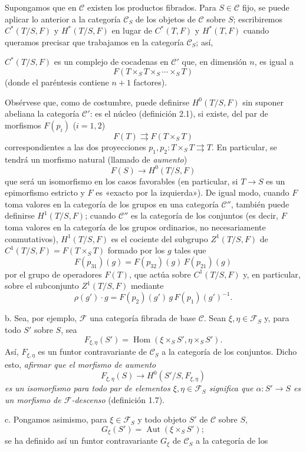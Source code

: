 Supongamos que en $\mathcal C$ existen los productos fibrados. Para
$S\in\mathcal C$ fijo, se puede aplicar lo anterior a la categoría
$\mathcal C_S$ de los objetos de $\mathcal C$ sobre $S$; escribiremos
$C^*(T/S,F)$ y $H^*(T/S,F)$ en lugar de $C^*(T,F)$ y $H^*(T,F)$ cuando
queramos precisar que trabajamos en la categoría $\mathcal C_S$; así,

$C^*(T/S,F)$ es un complejo de cocadenas en $\mathcal C'$ que, en dimensión
$n$, es igual a
\[
  F(T\times_ST\times_S\cdots\times_ST)
\]
(donde el paréntesis contiene $n+1$ factores).

Obsérvese que, como de costumbre, puede definirse $H^0(T/S,F)$ sin suponer
abeliana la categoría $\mathcal C'$: es el núcleo (definición 2.1), si existe,
del par de morfismos $F(p_i)$ ($i=1,2$)
\[
  F(T)\rightrightarrows F(T\times_ST)
\]
correspondientes a las dos proyecciones
$p_1,p_2:T\times_ST\rightrightarrows T$. En particular, se tendrá un morfismo
natural (llamado de \emph{aumento})
\[
  F(S)\longrightarrow H^0(T/S,F)
\]
que será un isomorfismo en los casos favorables (en particular, si
$T\longrightarrow S$ es un epimorfismo estricto y $F$ es «exacto por la
izquierda»). De igual modo, cuando $F$ toma valores en la categoría de los
grupos en una categoría $\mathcal C''$, también puede definirse $H^1(T/S,F)$;
cuando $\mathcal C''$ es la categoría de los conjuntos (es decir, $F$ toma
valores en la categoría de los grupos ordinarios, no necesariamente
conmutativos), $H^1(T/S,F)$ es el cociente del subgrupo $Z^1(T/S,F)$ de
$C^1(T/S,F)=F(T\times_ST)$ formado por los $g$ tales que
\[
  F(p_{31})(g)=F(p_{32})(g)\,F(p_{21})(g)
\]
por el grupo de operadores $F(T)$, que actúa sobre $C^1(T/S,F)$ y, en
particular, sobre el subconjunto $Z^1(T/S,F)$ mediante
\[
  \rho(g')\cdot g=F(p_2)(g')\,g\,F(p_1)(g')^{-1}.
\]

\medskip\noindent
b. Sea, por ejemplo, $\mathcal F$ una categoría fibrada de base $\mathcal C$.
Sean $\xi,\eta\in\mathcal F_S$ y, para todo $S'$ sobre $S$, sea
\[
  F_{\xi,\eta}(S')=
  \operatorname{Hom}(\xi\times_SS',\eta\times_SS').
\]
Así, $F_{\xi,\eta}$ es un funtor contravariante de $\mathcal C_S$ a la
categoría de los conjuntos. Dicho esto, \emph{afirmar que el morfismo de
aumento}
\[
  F_{\xi,\eta}(S)\longrightarrow H^0(S'/S,F_{\xi,\eta})
\]
\emph{es un isomorfismo para todo par de elementos
$\xi,\eta\in\mathcal F_S$ significa que
$\alpha:S'\longrightarrow S$ es un morfismo de $\mathcal F$-descenso}
(definición 1.7).

\medskip\noindent
c. Pongamos asimismo, para $\xi\in\mathcal F_S$ y todo objeto $S'$ de
$\mathcal C$ sobre $S$,
\[
  G_\xi(S')=\operatorname{Aut}(\xi\times_SS') ;
\]
se ha definido así un funtor contravariante $G_\xi$ de $\mathcal C_S$ a la
categoría de los

